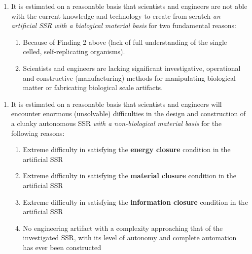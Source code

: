 \bigskip

\begin{enumerate}
\item It is estimated on a reasonable basis that scientists and
engineers are not able with the current knowledge and technology to
create from scratch \textit{an artificial SSR with a biological
material basis} for two fundamental reasons:

\begin{enumerate}
\item Because of Finding 2 above (lack of full understanding of the
single celled, self-replicating organisms).
\item Scientists and engineers are lacking significant investigative,
operational and constructive (manufacturing) methods for manipulating
biological matter or fabricating biological scale artifacts.
\end{enumerate}
\end{enumerate}

\bigskip

\begin{enumerate}
\item It is estimated on a reasonable basis that scientists and
engineers will encounter enormous (unsolvable) difficulties in the
design and construction of a clunky autonomous SSR \textit{with a
non-biological material basis} for the following reasons:

\begin{enumerate}
\item Extreme difficulty in satisfying the \textbf{energy closure}
condition in the artificial SSR 
\item Extreme difficulty in satisfying the \textbf{material closure}
condition in the artificial SSR 
\item Extreme difficulty in satisfying the \textbf{information closure}
condition in the artificial SSR
\item No engineering artifact with a complexity approaching that of the
investigated SSR, with its level of autonomy and complete automation
has ever been constructed
\end{enumerate}
\end{enumerate}

\bigskip

